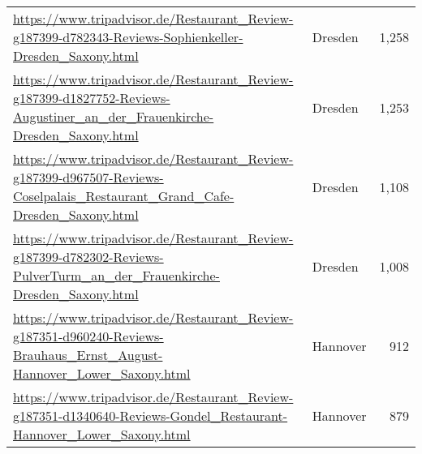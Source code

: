 \begin{table}[H]
{\begin{tabular}{llr}
\url{https://www.tripadvisor.de/Restaurant\_Review-g187399-d782343-Reviews-Sophienkeller-Dresden\_Saxony.html} & Dresden & 1,258 \\ 
\url{https://www.tripadvisor.de/Restaurant\_Review-g187399-d1827752-Reviews-Augustiner\_an\_der\_Frauenkirche-Dresden\_Saxony.html} & Dresden & 1,253 \\ 
\url{https://www.tripadvisor.de/Restaurant\_Review-g187399-d967507-Reviews-Coselpalais\_Restaurant\_Grand\_Cafe-Dresden\_Saxony.html} & Dresden & 1,108 \\ 
\url{https://www.tripadvisor.de/Restaurant\_Review-g187399-d782302-Reviews-PulverTurm\_an\_der\_Frauenkirche-Dresden\_Saxony.html} & Dresden & 1,008 \\ 
\url{https://www.tripadvisor.de/Restaurant\_Review-g187351-d960240-Reviews-Brauhaus\_Ernst\_August-Hannover\_Lower\_Saxony.html} & Hannover & 912 \\ 
\url{https://www.tripadvisor.de/Restaurant\_Review-g187351-d1340640-Reviews-Gondel\_Restaurant-Hannover\_Lower\_Saxony.html} & Hannover & 879 \\ 
\hline
\end{tabular}
}
\end{table}